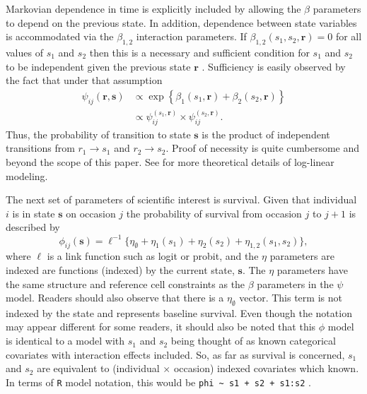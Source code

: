 \documentclass[fleqn]{article}
\newcommand{\bs}{\ensuremath{\mathbf{s}}}
\newcommand{\br}{\ensuremath{\mathbf{r}}}
\begin{document}
Markovian dependence in time is explicitly included by allowing the $\beta$
parameters to depend on the previous state. In addition, dependence between
state variables is accommodated via the $\beta_{1,2}$ interaction parameters. If
$\beta_{1,2}(s_1,s_2,\br)=0$ for all values of $s_1$ and $s_2$ then this is a
necessary and sufficient condition for $s_1$ and $s_2$ to be independent given
the previous state $\br$ \citep{xxx}. Sufficiency is easily observed by the fact
that under that assumption
\begin{equation}
\begin{split}
\psi_{ij}(\br,\bs) &\propto \exp\left\{\beta_1(s_1,\br) + \beta_2(s_2,\br)\right\}\\
 & \propto \psi_{ij}^{(s_1,\br)}\times \psi_{ij}^{(s_2,\br)}.
 \end{split}
 \end{equation}
Thus, the probability of transition to state $\bs$ is the product of independent transitions from $r_1 \to s_1$ and $r_2 \to s_2$. Proof of necessity is quite cumbersome and beyond the scope of this paper. See \citet{xxx} for more theoretical details of log-linear modeling. 

The next set of parameters of scientific interest is survival. Given that individual $i$ is in state $\bs$ on occasion $j$ the probability of survival from occasion $j$ to $j+1$ is described by
\begin{equation}
\phi_{ij}(\bs) = \ell^{-1}\{\eta_\emptyset + \eta_1(s_1) + \eta_2(s_2) + \eta_{1,2}(s_1,s_2)\},
\end{equation}
where $\ell$ is a link function such as logit or probit, and the $\eta$ parameters are indexed are functions (indexed) by the current state, $\bs$. The $\eta$ parameters have the same structure and reference cell constraints as the $\beta$ parameters  in the $\psi$ model. Readers should also observe that there is a $\eta_\emptyset$ vector. This term is not indexed by the state and represents baseline survival. Even though the notation may appear different for some readers, it should also be noted that this $\phi$ model is identical to a model with $s_1$ and $s_2$ being thought of as known categorical covariates with interaction effects included. So, as far as survival is concerned, $s_1$ and $s_2$ are equivalent to (individual $\times$ occasion) indexed covariates which known. In terms of {\tt R} model notation, this would be \verb#phi ~ s1 + s2 + s1:s2# .
\end{document}
